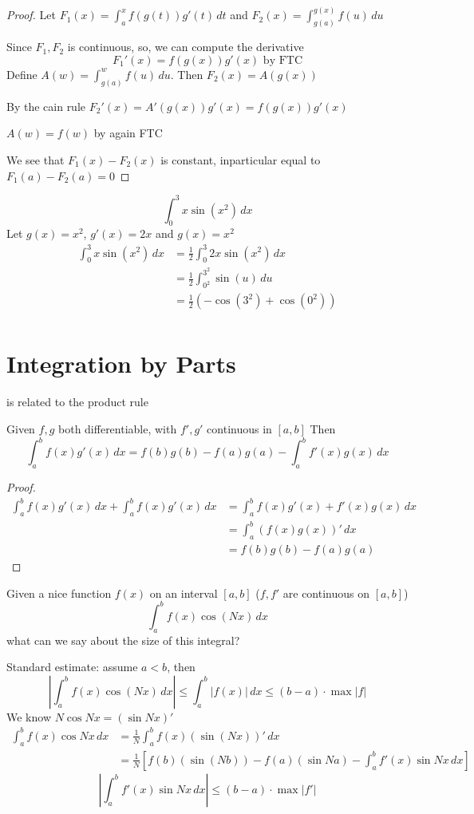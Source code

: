 \begin{proof}
  Let $\displaystyle F_1(x) = \int_a^x f(g(t))g'(t)\,dt$ and $\displaystyle F_2(x) = \int_{g(a)}^{g(x)} f(u)\,du$

  Since $F_1, F_2$ is continuous, so, we can compute the derivative
  \[F_1'(x) = f(g(x))g'(x) \text{ by FTC} \]
  Define $\displaystyle A(w) = \int_{g(a)}^w f(u)\,du$. Then $F_2(x) = A(g(x))$

  By the cain rule $F_2'(x) = A'(g(x))g'(x) = f(g(x))g'(x)$

  $A(w) = f(w)$ by again FTC

  We see that $F_1(x) - F_2(x)$ is constant, inparticular equal to $F_1(a) - F_2(a) = 0$
\end{proof}

\begin{example*}
  \[\int_0^3 x \sin(x^2) \, dx\]
  Let $g(x) = x^2$, $g'(x) = 2x$ and $g(x) = x^2$
  \begin{align*}
  \int_0^3 x \sin(x^2) \, dx &= \frac{1}{2} \int_0^3 2x \sin(x^2)\,dx \\
  &= \frac{1}{2} \int_{0^2}^{3^2} \sin(u)\, du \\
  &= \frac{1}{2}(-\cos(3^2) + \cos(0^2)) \\
  \end{align*}
\end{example*}

\section{Integration by Parts}
is related to the product rule
\begin{theorem*}
  Given $f, g$ both differentiable, with $f', g'$ continuous in $[a, b]$
  Then
  \[\int_a^b f(x)g'(x)\,dx = f(b)g(b) - f(a)g(a) - \int_a^b f'(x)g(x)\,dx\]
\end{theorem*}

\begin{proof}
  \begin{align*}
    \int_a^b f(x)g'(x)\,dx + \int_a^b f(x)g'(x)\, dx &= \int_a^b f(x)g'(x) + f'(x)g(x)\, dx \\
    &= \int_a^b (f(x)g(x))'\, dx \\
    &= f(b)g(b) - f(a)g(a)
  \end{align*}
\end{proof}

\begin{example*}
Given a nice function $f(x)$ on an interval $[a, b]$ ($f, f'$ are continuous on $[a, b]$)
\[\int_a^b f(x)\cos(Nx)\, dx\]
what can we say about the size of this integral?

Standard estimate: assume $a < b$, then 
\[\left|\int_a^b f(x)\cos(Nx)\,dx\right| \le \int_a^b |f(x)|\,dx \le (b-a)\cdot \max|f|\]
We know $N\cos Nx = (\sin Nx)'$
\begin{align*}
  \int_a^b f(x)\cos Nx\, dx &= \frac{1}{N} \int_a^b f(x)(\sin(Nx))'\,dx \\
  &= \frac{1}{N}\left[f(b)(\sin(Nb)) - f(a)(\sin Na) - \int_a^b f'(x)\sin Nx\, dx\right]
\end{align*}
\[\left|\int_a^b f'(x)\sin Nx\, dx \right| \le (b-a)\cdot \max|f'|\]
\end{example*}

